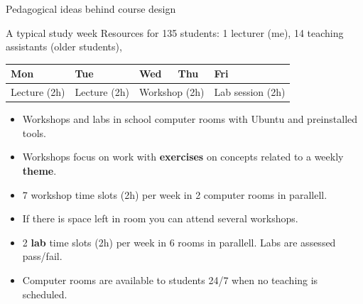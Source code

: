 \documentclass[aspectratio=169]{beamer}
\newenvironment{Slide}[1]%
  {\begin{frame}[environment=Slide]{#1}}
  {\end{frame}}%
\begin{document}
\begin{Slide}{Pedagogical ideas behind course design}
  \end{Slide}

\begin{Slide}{A typical study week}
  Resources for 135 students: 1 lecturer (me), 14 teaching assistants (older students), 
\begin{table}\centering
  \begin{tabular}{l | l |l l | l}
  Mon & Tue & Wed & Thu & Fri \\ \hline
  Lecture (2h) & Lecture (2h) & \multicolumn{2}{c|}{Workshop (2h)} & Lab session (2h) \\ \hline
  \end{tabular}
\end{table}
  \begin{itemize}
    \item Workshops and labs in school computer rooms with Ubuntu and preinstalled tools. 
    \item Workshops focus on work with \textbf{exercises} on concepts related to a weekly \textbf{theme}. 
    \item 7 workshop time slots (2h) per week in 2 computer rooms in parallell. 
    \item If there is space left in room you can attend several workshops.
    \item 2 \textbf{lab} time slots (2h) per week in 6 rooms in parallell. Labs are assessed pass/fail.
    \item Computer rooms are available to students 24/7 when no teaching is scheduled.
  \end{itemize}
\end{Slide}  
\end{document}
